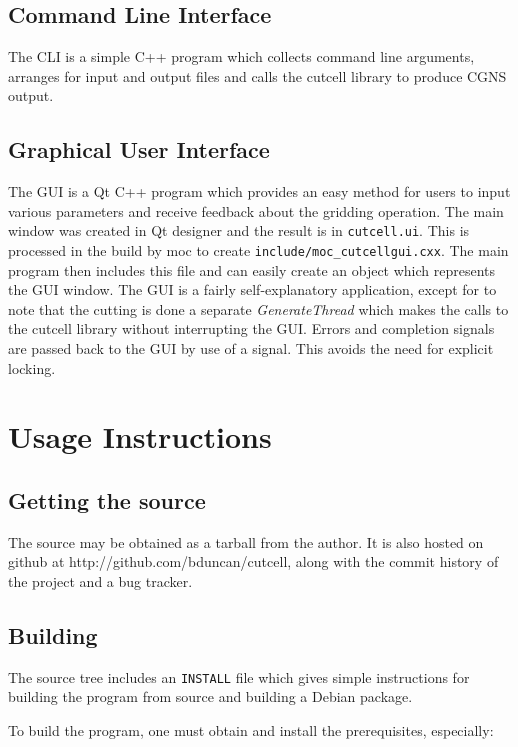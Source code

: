 \documentclass[a4paper,10pt]{article}
\begin{document}
\subsection{Command Line Interface}

The CLI is a simple C++ program which collects command line arguments, arranges
for input and output files and calls the cutcell library to produce CGNS output.

\subsection{Graphical User Interface}

The GUI is a Qt \cite{qt} C++ program which provides an easy method for users
to input various parameters and receive feedback about the gridding operation.
The main window was created in Qt designer and the result is in
\texttt{cutcell.ui}. This is processed in the build by moc to create
\texttt{include/moc\_cutcellgui.cxx}. The main program then includes this file
and can easily create an object which represents the GUI window. The GUI is a
fairly self-explanatory application, except for to note that the cutting is
done a separate \textit{GenerateThread} which makes the calls to the cutcell
library without interrupting the GUI. Errors and completion signals are passed
back to the GUI by use of a signal. This avoids the need for explicit locking.

\section{Usage Instructions}

\subsection{Getting the source}

The source may be obtained as a tarball from the author. It is also hosted on
github at http://github.com/bduncan/cutcell, along with the commit history of
the project and a bug tracker.

\subsection{Building}

The source tree includes an \texttt{INSTALL} file which gives simple
instructions for building the program from source and building a Debian
package.

To build the program, one must obtain and install the prerequisites, especially:
\end{document}
